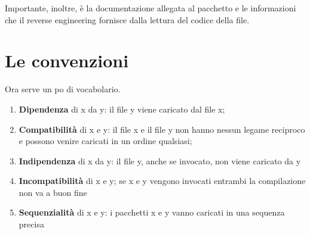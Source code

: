 Importante, inoltre, è la documentazione allegata al  pacchetto e le informazioni che il 
\foreignlanguage{english}{reverse engineering} fornisce dalla lettura del codice della file. 
\section{Le convenzioni}
 Ora serve un po di vocabolario. 
 \begin{enumerate}
 	\item \textbf{Dipendenza} di x da y: il file y viene caricato dal file x;
 	\item \textbf{Compatibilità} di x e y: il file x e il file y non hanno nessun legame reciproco e possono venire caricati in un ordine qualsiasi;
 	\item \textbf{Indipendenza} di x da y: il file y, anche se invocato, non viene caricato da y
 	\item \textbf{Incompatibilità} di x e y; se x e y vengono invocati entrambi la compilazione non va a buon fine
 	\item \textbf{Sequenzialità }di x e y: i pacchetti x e y vanno caricati in una sequenza precisa
 \end{enumerate}
